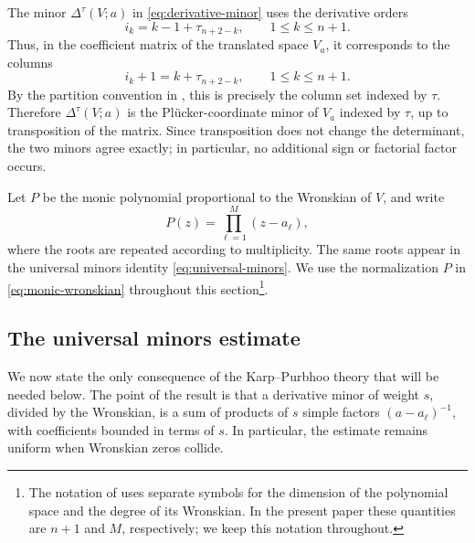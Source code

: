 \documentclass[12pt,letterpaper,reqno]{amsart}
\theoremstyle{definition}
\numberwithin{equation}{section}
\begin{document}
The minor \(\Delta^\tau(V;a)\) in
\eqref{eq:derivative-minor} uses the derivative orders
\[
i_k=k-1+\tau_{n+2-k},
\qquad 1\leq k\leq n+1.
\]
Thus, in the coefficient matrix of the translated space \(V_a\), it
corresponds to the columns
\[
i_k+1=k+\tau_{n+2-k},
\qquad 1\leq k\leq n+1.
\]
By the partition convention in \cite[equation~(2.5)]{KP26}, this is
precisely the column set indexed by \(\tau\). Therefore
\(\Delta^\tau(V;a)\) is the Pl\"ucker-coordinate minor of \(V_a\)
indexed by \(\tau\), up to transposition of the matrix. Since
transposition does not change the determinant, the two minors agree
exactly; in particular, no additional sign or factorial factor occurs.

Let \(P\) be the monic polynomial proportional to the Wronskian of
\(V\), and write
\begin{equation}\label{eq:monic-wronskian}
 P(z)=\prod_{\ell=1}^M(z-a_\ell),
\end{equation}
where the roots are repeated according to multiplicity. The same roots
appear in the universal minors identity \eqref{eq:universal-minors}.
We use the normalization \(P\) in \eqref{eq:monic-wronskian}
throughout this section\footnote{The notation of \cite{KP26} uses separate symbols for the dimension of
the polynomial space and the degree of its Wronskian. In the present
paper these quantities are \(n+1\) and \(M\), respectively; we keep this
notation throughout.}.




\subsection{The universal minors estimate}
\label{sec:universal-minors}

We now state the only consequence of the Karp--Purbhoo theory that will
be needed below. The point of the result is that a derivative minor of
weight \(s\), divided by the Wronskian, is a sum of products of \(s\)
simple factors \((a-a_\ell)^{-1}\), with coefficients bounded in
terms of \(s\). In particular, the estimate remains uniform when
Wronskian zeros collide.
\end{document}
